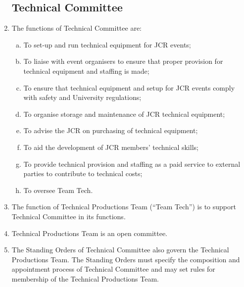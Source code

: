 \documentclass[12pt]{article}
\begin{document}
\begin{enumerate}
    \subsection{Technical Committee}
    \item The functions of Technical Committee are:
    \begin{enumerate}[(a)]
        \item To set-up and run technical equipment for JCR events;
        \item To liaise with event organisers to ensure that proper provision for technical equipment and staffing is made;
        \item To ensure that technical equipment and setup for JCR events comply with safety and University regulations;
        \item To organise storage and maintenance of JCR technical equipment;
        \item To advise the JCR on purchasing of technical equipment;
        \item To aid the development of JCR members' technical skills;
        \item To provide technical provision and staffing as a paid service to external parties to contribute to technical costs;
        \item To oversee Team Tech.
    \end{enumerate}
    \item The function of Technical Productions Team (``Team Tech'') is to support Technical Committee in its functions.
    \item Technical Productions Team is an open committee.
    \item The Standing Orders of Technical Committee also govern the Technical Productions Team. The Standing Orders must specify the composition and appointment process of Technical Committee and may set rules for membership of the Technical Productions Team.

\end{enumerate}
\end{document}
